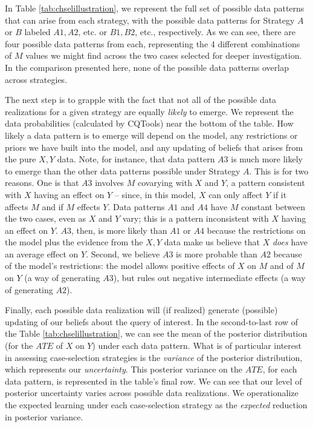 \documentclass[
  12pt,
]{book}
\begin{document}
In Table \ref{tab:chselillustration}, we represent the full set of possible data patterns that can arise from each strategy, with the possible data patterns for Strategy \(A\) or \(B\) labeled \(A1, A2\), etc. or \(B1, B2\), etc., respectively. As we can see, there are four possible data patterns from each, representing the 4 different combinations of \(M\) values we might find across the two cases selected for deeper investigation. In the comparison presented here, none of the possible data patterns overlap across strategies.

The next step is to grapple with the fact that not all of the possible data realizations for a given strategy are equally \emph{likely} to emerge. We represent the data probabilities (calculated by CQTools) near the bottom of the table. How likely a data pattern is to emerge will depend on the model, any restrictions or priors we have built into the model, and any updating of beliefs that arises from the pure \(X,Y\) data. Note, for instance, that data pattern \(A3\) is much more likely to emerge than the other data patterns possible under Strategy \(A\). This is for two reasons. One is that \(A3\) involves \(M\) covarying with \(X\) and \(Y\), a pattern consistent with \(X\) having an effect on \(Y\) -- since, in this model, \(X\) can only affect \(Y\) if it affects \(M\) and if \(M\) effects \(Y\). Data patterns \(A1\) and \(A4\) have \(M\) constant between the two cases, even as \(X\) and \(Y\) vary; this is a pattern inconsistent with \(X\) having an effect on \(Y\). \(A3\), then, is more likely than \(A1\) or \(A4\) because the restrictions on the model plus the evidence from the \(X,Y\) data make us believe that \(X\) \emph{does} have an average effect on \(Y\). Second, we believe \(A3\) is more probable than \(A2\) because of the model's restrictions: the model allows positive effects of \(X\) on \(M\) and of \(M\) on \(Y\) (a way of generating \(A3\)), but rules out negative intermediate effects (a way of generating \(A2\)).

Finally, each possible data realization will (if realized) generate (possible) updating of our beliefs about the query of interest. In the second-to-last row of the Table \ref{tab:chselillustration}, we can see the mean of the posterior distribution (for the \(ATE\) of \(X\) on \(Y\)) under each data pattern. What is of particular interest in assessing case-selection strategies is the \emph{variance} of the posterior distribution, which represents our \emph{uncertainty}. This posterior variance on the \(ATE\), for each data pattern, is represented in the table's final row. We can see that our level of posterior uncertainty varies across possible data realizations. We operationalize the expected learning under each case-selection strategy as the \emph{expected} reduction in posterior variance.
\end{document}
